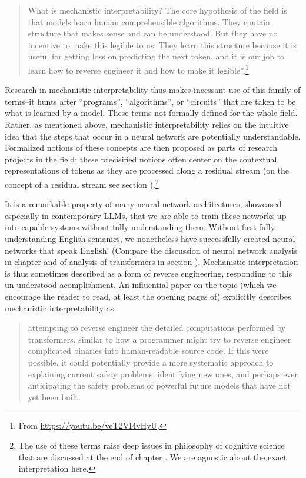 \begin{quote}
What is mechanistic interpretability? The core hypothesis of the field is that
models learn human comprehensible algorithms. They contain structure that makes
sense and can be understood. But they have no incentive to make this legible to
us. They learn this structure because it is useful for getting loss on
predicting the next token, and it is our job to learn how to reverse engineer
it and how to make it
legible''.\footnote{From \url{https://youtu.be/veT2VI4vHyU}.}
\end{quote}

Research in mechanistic interpretability thus makes incessant use of this
family of terms--it hunts after ``programs'', ``algorithms'', or ``circuits''
that are taken to be what is learned by a model. These terms not formally
defined for the whole field. Rather, as mentioned above, mechanistic
interpretability relies on the intuitive idea that the steps that occur in a
neural network are potentially understandable. Formalized notions of these
concepts are then proposed as parts of research projects in the field; these
precisified notions often center on the contextual representations of tokens as
they are processed along a residual stream (on the concept of a residual stream see section ).\footnote{The use of
these terms raise deep issues in philosophy of cognitive science that are
discussed at the end of chapter .  We are agnostic
about the exact interpretation here.}

It is a remarkable property of many neural network architectures, showcased
especially in contemporary LLMs, that we are able to train these networks up
into capable systems without fully understanding them. Without first fully
understanding English semanics, we nonetheless have successfully created neural
networks that speak English! (Compare the discussion of neural network analysis
in chapter  and of analysis of transformers in section
). Mechanistic interpretation is thus sometimes described as
a form of reverse engineering, responding to this un-understood acomplishment.
An influential paper on the topic (which we encourage the reader to read, at
least the opening pages of) explicitly describes mechanistic interpretability
as

\begin{quote}
attempting to reverse engineer the detailed computations performed by
transformers, similar to how a programmer might try to reverse engineer
complicated binaries into human-readable source code.  If this were possible,
it could potentially provide a more systematic approach to explaining current
safety problems, identifying new ones, and perhaps even anticipating the safety
problems of powerful future models that have not yet been
built.\cite{elhage2021mathematical} 
\end{quote}

